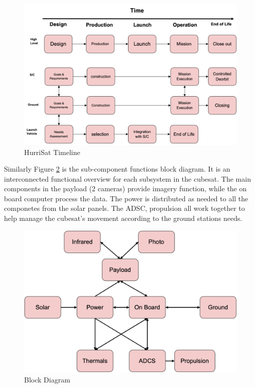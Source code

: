 \begin{figure}[hbt!]
    \vspace{5mm}
    \centering
    \includegraphics[keepaspectratio,width=\textwidth, frame, scale=0.8]{Images/timeline.png}
    \caption{HurriSat Timeline}
    \label{fig:timelin}
\end{figure}
\vspace{1cm}
Similarly Figure \ref{fig:diagram} is the sub-component functions block diagram. It is an interconnected functional overview for each subsystem in the cubesat. The main components in the payload (2 cameras) provide imagery function, while the on board computer process the data. The power is distributed as needed to all the componetes from the solar panels. The ADSC, propulsion all work together to help manage the cubesat's movement according to the ground stations needs.\\
\begin{figure}[hbt!]
    \vspace{5mm}
    \centering
    \includegraphics[keepaspectratio,width=\textwidth, frame, scale=0.8]{Images/diagram.png}
    \caption{Block Diagram}
    \label{fig:diagram}
\end{figure}
\FloatBarrier
